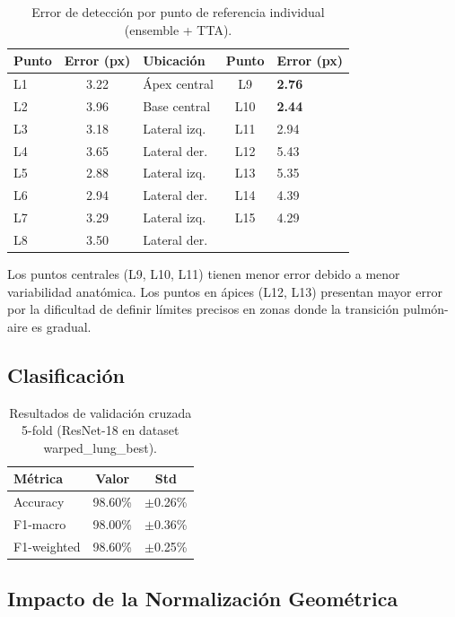 \documentclass[12pt,a4paper]{article}
\begin{document}
\begin{table}[H]
\centering
\small
\begin{tabular}{lclcl}
\toprule
\textbf{Punto} & \textbf{Error (px)} & \textbf{Ubicación} & \textbf{Punto} & \textbf{Error (px)} \\
\midrule
L1 & 3.22 & Ápex central & L9 & \textbf{2.76} \\
L2 & 3.96 & Base central & L10 & \textbf{2.44} \\
L3 & 3.18 & Lateral izq. & L11 & 2.94 \\
L4 & 3.65 & Lateral der. & L12 & 5.43 \\
L5 & 2.88 & Lateral izq. & L13 & 5.35 \\
L6 & 2.94 & Lateral der. & L14 & 4.39 \\
L7 & 3.29 & Lateral izq. & L15 & 4.29 \\
L8 & 3.50 & Lateral der. & & \\
\bottomrule
\end{tabular}
\caption{Error de detección por punto de referencia individual (ensemble + TTA).}
\end{table}

Los puntos centrales (L9, L10, L11) tienen menor error debido a menor variabilidad anatómica. Los puntos en ápices (L12, L13) presentan mayor error por la dificultad de definir límites precisos en zonas donde la transición pulmón-aire es gradual.

\subsection{Clasificación}

\begin{table}[H]
\centering
\begin{tabular}{lcc}
\toprule
\textbf{Métrica} & \textbf{Valor} & \textbf{Std} \\
\midrule
Accuracy & 98.60\% & $\pm$0.26\% \\
F1-macro & 98.00\% & $\pm$0.36\% \\
F1-weighted & 98.60\% & $\pm$0.25\% \\
\bottomrule
\end{tabular}
\caption{Resultados de validación cruzada 5-fold (ResNet-18 en dataset warped\_lung\_best).}
\end{table}

\subsection{Impacto de la Normalización Geométrica}
\end{document}
